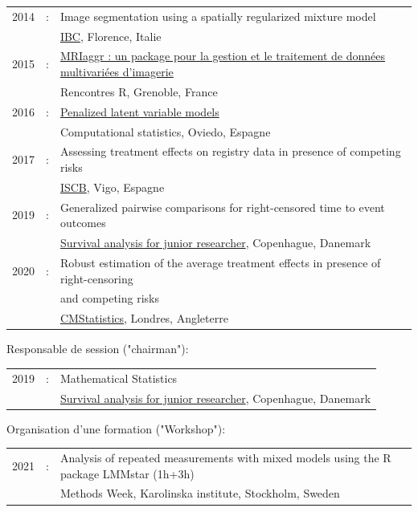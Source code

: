 \documentclass[12pt]{article}
\begin{document}
\begin{tabular}{l@{ }l@{ }l}
2014 &:& Image segmentation using a spatially regularized mixture model \\
&& \href{https://www.biometricsociety.org/meetings-events/ibcs/}{IBC}, Florence, Italie \\
2015 &:& \href{https://r2015-grenoble.sciencesconf.org/66037}{MRIaggr : un package pour la gestion et le traitement de données multivariées d'imagerie} \\
&& Rencontres R, Grenoble, France \\
2016 &:& \href{http://cmstatistics.org/RegistrationsV2/COMPSTAT2016/viewSubmission.php?in=440&token=29584n1s18p97n65o7p1r5n36sopq0n4}{Penalized latent variable models} \\
&& Computational statistics, Oviedo, Espagne \\
2017 &:& Assessing treatment effects on registry data in presence of competing risks \\ 
&& \href{http://www.iscb2017.info/}{ISCB}, Vigo, Espagne \\
2019 &:& Generalized pairwise comparisons for right-censored time to event outcomes \\
&& \href{https://publicifsv.sund.ku.dk/~safjr2019/}{Survival analysis for junior researcher}, Copenhague, Danemark \\
2020 &:& Robust estimation of the average treatment effects in presence of right-censoring \\
&& and competing risks \\
&& \href{http://www.cmstatistics.org/conferences.php}{CMStatistics}, Londres, Angleterre \\
\end{tabular}

\bigskip

Responsable de session ("chairman"):

\smallskip

\begin{tabular}{l@{ }l@{ }l}
2019 &:& Mathematical Statistics \\
&& \href{https://publicifsv.sund.ku.dk/~safjr2019/}{Survival analysis for junior researcher}, Copenhague, Danemark
\end{tabular}

\bigskip

Organisation d'une formation ("Workshop"):
\begin{tabular}{l@{ }l@{ }l}
2021 &:& Analysis of repeated measurements with mixed models using the R package LMMstar (1h+3h) \\
&& Methods Week, Karolinska institute, Stockholm, Sweden
\end{tabular}

\smallskip




\end{document}
